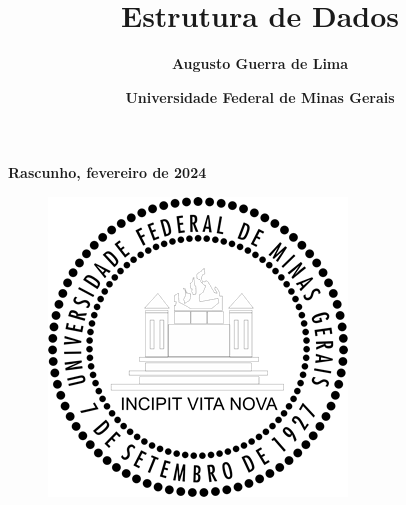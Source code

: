 \documentclass{article}
\title{\Huge\textbf{Estrutura de Dados}}
\author{\textbf{Augusto Guerra de Lima}}
\date{\textbf{Universidade Federal de Minas Gerais}}
\begin{document}
\maketitle
\textbf{Rascunho, fevereiro de 2024}
\begin{figure}
  \centering
  \includegraphics[width=0.2\linewidth]{img/UFMG.png}
\end{figure}

\newpage
\large

\tableofcontents

\newpage


\end{document}
